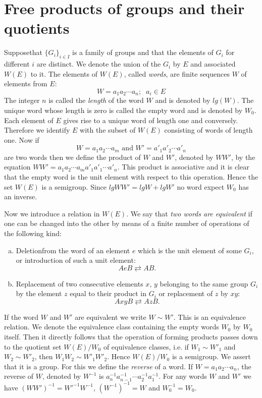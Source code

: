 \section{Free products of groups and their quotients}\label{sec2} %

Suppose\pageoriginale that $\{ G_i \}_{i \in I}$ is a family of groups
and that the elements of $G_i$ for different $i$ are distinct. We
denote the union of the $G_i$ by $E$ and associated $W(E)$ to it. The
elements of $W(E)$, called \textit{words}, are finite sequences $W$
of elements from $E$:  
$$
W=a_1 a_2 \cdots a_n ; \;\; a_i \in E 
$$
The integer $n$ is called the \textit{length} of the word $W$ and is
denoted by $lg(W)$. The unique word whose length is zero is called the
empty word and is denoted by $W_0$. Each element of $E$ gives rise to
a unique word of length one and conversely. Therefore we identify $E$
with the subset of $W(E)$ consisting of words of length one. Now if 
$$
W=a_1 a_2 \cdots a_m \text{ and } W'=a'_1a'_2 \cdots a'_n
$$
are two words then we define the product of $W$ and $W'$, denoted by
$WW'$, by the equation $WW'=a_1 a_2 \cdots a_m a'_1a'_1 \cdots
a'_n$. This product is associative and it is clear that the empty
word is the unit element with respect to this operation. Hence the set
$W(E)$ is a semigroup. Since $lg WW'=lg W+ lgW'$ no word expect $W_0$
has an inverse. 

Now we introduce a relation in $W(E)$. We say that \textit{two words
  are equivalent} if one can be changed into the other by means of a
finite number of operations of the following kind: 
\begin{enumerate}[(a)]
\item Deletion\pageoriginale from the word of an element $e$ which is
  the unit element of some $G_i$, or introduction of such a unit
  element:  
$$ 
A eB \rightleftarrows AB.
$$

\item Replacement of two consecutive elements $x$, $y$ belonging to
  the same group $G_i$ by the element $z$ equal to their product in
  $G_i$ or replacement of $z$ by $xy$: 
$$
A xyB \rightleftarrows AzB. 
$$
\end{enumerate}

\noindent
If the word $W$ and $W'$ are equivalent we write $W \sim W'$. This is
an equivalence relation. We denote the equivalence class containing
the empty words $W_0$ by $W_0$ itself. Then it directly follows that
the operation of forming products passes down to the quotient set
$W(E)/W_0$ of equivalence classes, i.e. if $W_1 \sim W'_1$ and $W_2
\sim W'_2$, then $W_1 W_2 \sim W'_1 W'_2$. Hence $W(E)/W_0$ is a
semigroup. We assert that it is a group. For this we define the
\textit{reverse} of a word. If $W=a_1 a_2 \cdots a_n$, the reverse of
$W$, denoted by $W^{-1}$ is $a^{-1}_n a^{-1}_{n-1} \cdots a^{-1}_2
a^{-1}_1$. For any words $W$ and $W'$ we have $(WW')^{-1}=W'^{-1}
W^{-1}$, $(W^{-1})^{-1}=W$ and $W^{-1}_0 =W_0$. 

